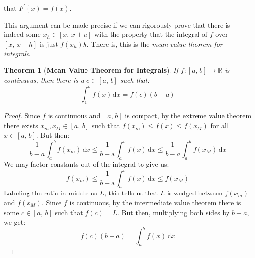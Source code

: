 \documentclass{article}
\newtheorem{theorem}{Theorem}
\begin{document}
        that $F^{\prime}(x)=f(x)$.
        \par\hfill\par
        This argument can be made precise if we can rigorously prove that
        there is indeed some $x_{h}\in[x,\,x+h]$ with the property that
        the integral of $f$ over $[x,\,x+h]$ is just $f(x_{h})h$. There is,
        this is the \textit{mean value theorem for integrals}.
        \begin{theorem}[\textbf{Mean Value Theorem for Integrals}]
            If $f:[a,\,b]\rightarrow\mathbb{R}$ is continuous, then there
            is a $c\in[a,\,b]$ such that:
            \begin{equation}
                \int_{a}^{b}f(x)\,\textrm{d}x
                =f(c)(b-a)
            \end{equation}
        \end{theorem}
        \begin{proof}
            Since $f$ is continuous and $[a,\,b]$ is compact, by the
            extreme value theorem there exists $x_{m},x_{M}\in[a,\,b]$ such
            that $f(x_{m})\leq{f}(x)\leq{f}(x_{M})$ for all
            $x\in[a,\,b]$. But then:
            \begin{equation}
                \frac{1}{b-a}
                \int_{a}^{b}f(x_{m})\,\textrm{d}x
                \leq
                \frac{1}{b-a}
                \int_{a}^{b}f(x)\,\textrm{d}x
                \leq
                \frac{1}{b-a}
                \int_{a}^{b}f(x_{M})\,\textrm{d}x
            \end{equation}
            We may factor constants out of the integral to give us:
            \begin{equation}
                f(x_{m})
                \leq
                \frac{1}{b-a}
                \int_{a}^{b}f(x)\,\textrm{d}x
                \leq
                f(x_{M})
            \end{equation}
            Labeling the ratio in middle as $L$, this tells us that
            $L$ is wedged between $f(x_{m})$ and $f(x_{M})$. Since $f$ is
            continuous, by the intermediate value theorem there is some
            $c\in[a,\,b]$ such that $f(c)=L$. But then, multiplying both sides
            by $b-a$, we get:
            \begin{equation}
                f(c)(b-a)
                =
                \int_{a}^{b}f(x)\,\textrm{d}x
            \end{equation}
        \end{proof}
\end{document}
